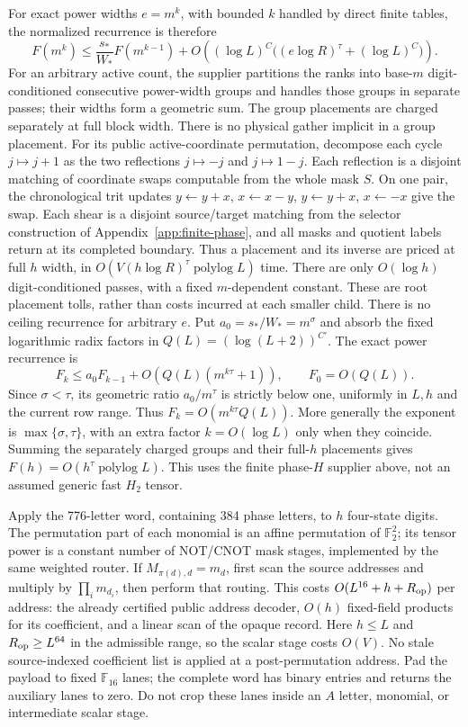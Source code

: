 For exact power widths $e=m^k$, with bounded $k$ handled by direct finite
tables, the normalized recurrence is therefore
\[
 F(m^k)\le \frac{s_*}{W_*}F(m^{k-1})
       +O\!\left((\log L)^C
          \bigl((e\log R)^\tau+(\log L)^C\bigr)\right).
\]
For an arbitrary active count, the supplier partitions the ranks into
base-$m$ digit-conditioned consecutive power-width groups and handles
those groups in separate passes; their widths form a geometric sum.
The group placements are charged separately at full block width.  There
is no physical gather implicit in a group placement. For its public
active-coordinate permutation, decompose each cycle $j\mapsto j+1$
as the two reflections $j\mapsto-j$ and $j\mapsto1-j$. Each reflection
is a disjoint matching of coordinate swaps computable from the whole
mask $S$. On one pair, the chronological trit updates
$y\gets y+x$, $x\gets x-y$, $y\gets y+x$, $x\gets-x$ give the swap.
Each shear is a disjoint source/target matching from the selector
construction of Appendix~\ref{app:finite-phase}, and all masks and
quotient labels return at its completed boundary. Thus a placement
and its inverse are priced at full $h$ width, in
$O(V(h\log R)^\tau\operatorname{polylog}L)$ time. There are only
$O(\log h)$ digit-conditioned passes, with a fixed $m$-dependent
constant. These are root placement tolls, rather than costs incurred
at each smaller child. There is no ceiling recurrence for arbitrary
$e$. Put $a_0=s_*/W_*=m^\sigma$ and absorb the fixed logarithmic
radix factors in $Q(L)=(\log(L+2))^{C'}$. The exact power recurrence is
\[
 F_k\le a_0F_{k-1}+O(Q(L)(m^{k\tau}+1)),\qquad F_0=O(Q(L)).
\]
Since $\sigma<\tau$, its geometric ratio $a_0/m^\tau$ is strictly
below one, uniformly in $L,h$ and the current row range. Thus
$F_k=O(m^{k\tau}Q(L))$. More generally the exponent is
$\max\{\sigma,\tau\}$, with an extra factor $k=O(\log L)$ only
when they coincide. Summing the separately charged groups and their
full-$h$ placements gives $F(h)=O(h^\tau\operatorname{polylog}L)$.
This uses the
finite phase-$H$ supplier above, not an assumed generic fast $H_2$ tensor.

Apply the 776-letter word, containing 384 phase letters, to $h$
four-state digits. The permutation part of each monomial
is an affine permutation of $\mathbb F_2^2$; its tensor power is a
constant number of NOT/CNOT mask stages, implemented by the same weighted
router. If $M_{\pi(d),d}=m_d$, first scan the source addresses and
multiply by $\prod_i m_{d_i}$, then perform that routing. This costs
$O(L^{16}+h+R_{\rm op})$ per address: the already certified public
address decoder, $O(h)$ fixed-field products for its coefficient,
and a linear scan of the opaque record. Here $h\le L$
and $R_{\rm op}\ge L^{64}$ in the admissible range, so the scalar
stage costs $O(V)$. No stale source-indexed coefficient list is
applied at a post-permutation address. Pad the payload to fixed
$\mathbb F_{16}$ lanes; the complete word has binary entries and returns
the auxiliary lanes to zero.  Do not crop these lanes inside an $A$
letter, monomial, or intermediate scalar stage.

